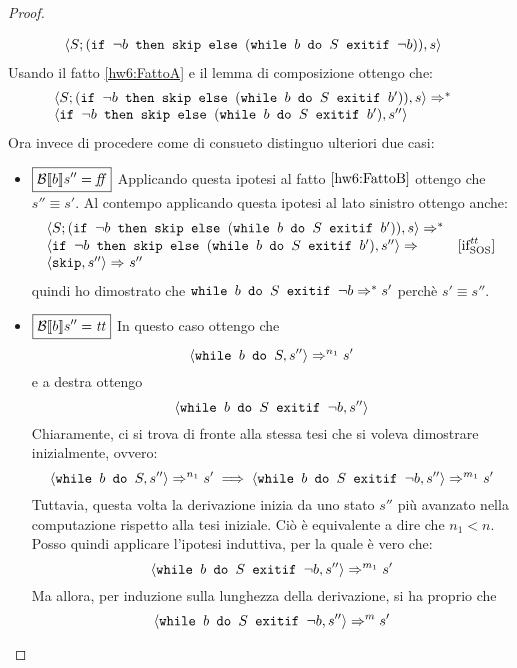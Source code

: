 \begin{enumerate}
\begin{proof}
\begin{itemize}
$$\begin{array}{ll}
	\confSs{S; (\ifABC{\neg b}{\skipForFriends}{(\wbSE{b}{S}{\neg b})})}{s} & \\
\end{array}
$$
Usando il fatto \ref{hw6:FattoA} e il lemma di composizione ottengo che:
$$
\begin{array}{ll}
\confSs{S; (\ifABC{\neg b}{\skipForFriends}{(\wbSE{b}{S}{b'})})}{s} \Rar{*} & \\
\confSs{\ifABC{\neg b}{\skipForFriends}{(\wbSE{b}{S}{b'})}}{s''}
\end{array}
$$
Ora invece di procedere come di consueto distinguo ulteriori due casi:
\begin{itemize}
\item $\boxed{\B{b}'' = \semfalse}$
Applicando questa ipotesi al fatto $\ref{hw6:FattoB}$ ottengo che $\boxed{s'' \equiv s'}$.
Al contempo applicando questa ipotesi al lato sinistro ottengo anche:
$$
\begin{array}{ll}
	\confSs{S; (\ifABC{\neg b}{\skipForFriends}{(\wbSE{b}{S}{b'})})}{s} \Rar{*} & \\
	\confSs{\ifABC{\neg b}{\skipForFriends}{(\wbSE{b}{S}{b'})}}{s''} \Rar{} & \ifttSOS \\
	\confSs{\skipForFriends}{s''} \Rar{ } s'' & \\
\end{array}
$$
quindi ho dimostrato che $\wbSE{b}{S}{\neg b} \Rar{*} s'$ perchè $s' \equiv s''$.
\item $\boxed{\B{b}'' = \semtrue}$
In questo caso ottengo che
$$
\confSs{\wbS{b}{S}}{s''} \Rar{n_1} s'
$$
e a destra ottengo
$$
\confSs{\wbSE{b}{S}{\neg b}}{s''}
$$
Chiaramente, ci si trova di fronte alla stessa tesi che si voleva dimostrare
inizialmente, ovvero:
$$
\confSs{\wbS{b}{S}}{s''} \Rar{n_1} s'
  \implies
\confSs{\wbSE{b}{S}{\neg b}}{s''} \Rar{m_1} s'
$$
Tuttavia, questa volta la derivazione inizia da uno stato $s''$ più avanzato
nella computazione rispetto alla tesi iniziale. Ciò è equivalente a dire che
$n_1 < n$. Posso quindi applicare l'ipotesi induttiva, per la quale è vero che:
$$
\confSs{\wbSE{b}{S}{\neg b}}{s''} \Rar{m_1} s'
$$
Ma allora, per induzione sulla lunghezza della derivazione, si ha proprio che
$$
\confSs{\wbSE{b}{S}{\neg b}}{s''} \Rar{m} s'
$$
\end{itemize}
\end{itemize}
\end{proof}
\end{enumerate}
